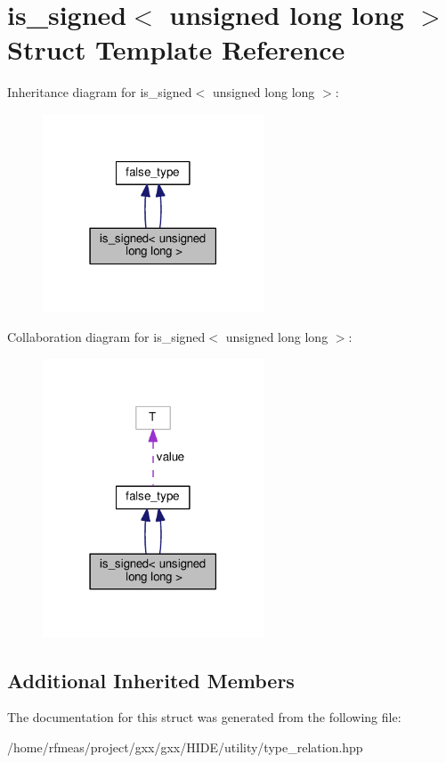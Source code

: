 \hypertarget{structis__signed_3_01unsigned_01long_01long_01_4}{}\section{is\+\_\+signed$<$ unsigned long long $>$ Struct Template Reference}
\label{structis__signed_3_01unsigned_01long_01long_01_4}


Inheritance diagram for is\+\_\+signed$<$ unsigned long long $>$\+:
\nopagebreak
\begin{figure}[H]
\begin{center}
\leavevmode
\includegraphics[width=186pt]{structis__signed_3_01unsigned_01long_01long_01_4__inherit__graph}
\end{center}
\end{figure}


Collaboration diagram for is\+\_\+signed$<$ unsigned long long $>$\+:
\nopagebreak
\begin{figure}[H]
\begin{center}
\leavevmode
\includegraphics[width=186pt]{structis__signed_3_01unsigned_01long_01long_01_4__coll__graph}
\end{center}
\end{figure}
\subsection*{Additional Inherited Members}


The documentation for this struct was generated from the following file\+:\begin{DoxyCompactItemize}
\item 
/home/rfmeas/project/gxx/gxx/\+H\+I\+D\+E/utility/type\+\_\+relation.\+hpp\end{DoxyCompactItemize}
